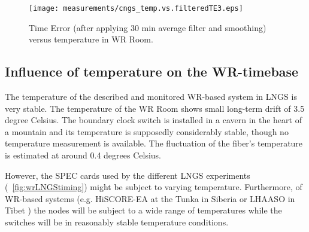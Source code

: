 \begin{figure}[!t]
\centering
\texttt{[image: measurements/cngs\_temp.vs.filteredTE3.eps]}
\caption{Time Error (after applying 30 min average filter and smoothing) versus temperature in WR Room.}
\label{fig:temp.vs.filteredTE}
\end{figure}



\subsection{Influence of temperature on the WR-timebase}

The temperature of the described and monitored WR-based system in LNGS is very stable. 
The temperature of the WR Room
shows small long-term drift of 3.5 degree Celsius. The boundary clock switch 
is installed in a cavern in the heart of a mountain and its temperature is supposedly considerably 
stable, though no temperature measurement is available. The fluctuation of the fiber's temperature 
is estimated at around 0.4 degrees Celsius. 

However, the SPEC cards used by the different LNGS experiments 
(\figurename~\ref{fig:wrLNGStiming}) might be subject to varying temperature. 
Furthermore,  of WR-based systems (e.g. HiSCORE-EA at the Tunka 
in Siberia \cite{biblio:tunka} or LHAASO in Tibet \cite{biblio:LHAASO}) the nodes will be subject 
to a wide range of temperatures while the switches will be in reasonably stable
temperature conditions.

